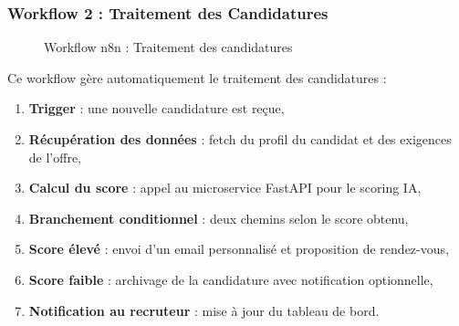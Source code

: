 \subsubsection{Workflow 2 : Traitement des Candidatures}
\label{subsubsec:workflow2-candidatures}

\begin{figure}[!ht]
    \centering
    \caption{Workflow n8n : Traitement des candidatures}
    \label{fig:workflow-candidatures}
\end{figure}

Ce workflow gère automatiquement le traitement des candidatures :

\begin{enumerate}
    \item \textbf{Trigger} : une nouvelle candidature est reçue,
    \item \textbf{Récupération des données} : fetch du profil du candidat et des exigences de l'offre,
    \item \textbf{Calcul du score} : appel au microservice FastAPI pour le scoring IA,
    \item \textbf{Branchement conditionnel} : deux chemins selon le score obtenu,
    \item \textbf{Score élevé} : envoi d'un email personnalisé et proposition de rendez-vous,
    \item \textbf{Score faible} : archivage de la candidature avec notification optionnelle,
    \item \textbf{Notification au recruteur} : mise à jour du tableau de bord.
\end{enumerate}


